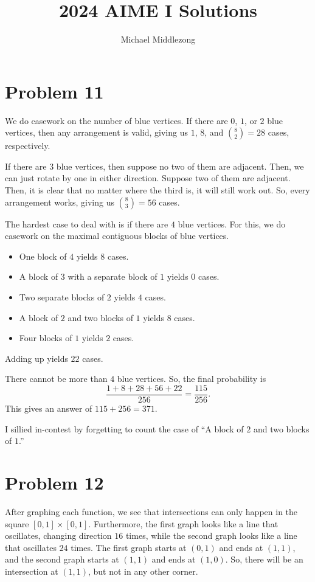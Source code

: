 \documentclass{scrartcl}
\title{2024 AIME I Solutions}
\author{Michael Middlezong}
\begin{document}
\maketitle

\section*{Problem 11}
We do casework on the number of blue vertices.
If there are $0$, $1$, or $2$ blue vertices,
then any arrangement is valid,
giving us $1$, $8$, and $\binom82 = 28$ cases, respectively.

If there are $3$ blue vertices, then suppose no two of them are adjacent.
Then, we can just rotate by one in either direction.
Suppose two of them are adjacent.
Then, it is clear that no matter where the third is,
it will still work out.
So, every arrangement works, giving us $\binom83 = 56$ cases.

The hardest case to deal with is if there are $4$ blue vertices.
For this, we do casework on the maximal contiguous blocks of blue vertices.
\begin{itemize}
\item One block of $4$ yields $8$ cases.
\item A block of $3$ with a separate block of $1$ yields $0$ cases.
\item Two separate blocks of $2$ yields $4$ cases.
\item A block of $2$ and two blocks of $1$ yields $8$ cases.
\item Four blocks of $1$ yields $2$ cases.
\end{itemize}
Adding up yields $22$ cases.

There cannot be more than $4$ blue vertices.
So, the final probability is
\[ \frac{1+8+28+56+22}{256} = \frac{115}{256}. \]
This gives an answer of $115 + 256 = \boxed{371}$.

\begin{remark*}
I sillied in-contest by forgetting to count the case of ``A block of $2$ and two blocks of $1$.''
\end{remark*}

\section*{Problem 12}
After graphing each function, we see that intersections can only happen in the square $[0, 1] \times [0,1]$.
Furthermore, the first graph looks like a line that oscillates, changing direction $16$ times,
while the second graph looks like a line that oscillates $24$ times.
The first graph starts at $(0,1)$ and ends at $(1,1)$,
and the second graph starts at $(1,1)$ and ends at $(1,0)$.
So, there will be an intersection at $(1,1)$, but not in any other corner.
\end{document}
